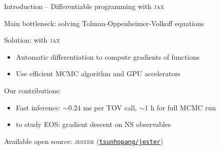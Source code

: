 \documentclass[usenames,dvipsnames,t]{beamer}
\begin{document}

    



  
    

\begin{frame}{Introduction --  Differentiable programming with \textsc{jax}}
  \def\x{5mm}
  \def\y{7mm}

  Main bottleneck: solving Tolman-Oppenheimer-Volkoff equations

  \vspace{\x}
  
  Solution:  with \textsc{jax}~\cite{frostig2018compiling}
  \begin{itemize}
    \vspace{\x}
    \item Automatic differentiation to compute gradients of functions
    
    \vspace{\x}
    
    \item Use efficient MCMC algorithm and GPU accelerators
  \end{itemize}

  \vspace{\x}

  Our contributions:

  \begin{itemize}
    \vspace{\x}

    \item Fast inference: $\sim 0.24$ ms per TOV call, $\sim 1$ h for full MCMC run

    \vspace{\x}

    \item {} to study EOS: gradient descent on NS observables
  \end{itemize}

  \vspace{\y}
  
  Available open source: \textsc{jester} (\href{https://github.com/tsunhopang/jester}{{\faGithub \texttt{tsunhopang/jester}}})
\end{frame}
\end{document}
